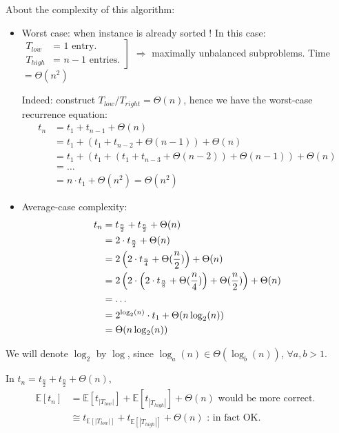 About the complexity of this algorithm:
\begin{itemize}
\renewcommand{\labelitemi}{$\bullet$}
\item Worst case: when instance is already sorted ! \newline
In this case: $\left.
	\begin{array}{ll}
       T_{low} & \text{= 1 entry}.\\
       T_{high} &\text{= $n-1$ entries}.
			\end{array}
  \right]$ $\Rightarrow$ maximally unbalanced subproblems. Time $= \Theta(n^2)$ 
	
	Indeed: construct $T_{low}/ T_{right} = \Theta(n)$, hence we have the worst-case recurrence equation: 
	\begin{align*}
t_n & = t_1 + t_{n-1}+ \Theta(n)\\
 & = t_1 + \left( t_1 + t_{n-2} + \Theta(n-1)\right)+ \Theta(n)\\
& = t_1 + \left( t_1 + (t_1 + t_{n-3}+ \Theta(n-2)) + \Theta(n-1)\right)+ \Theta(n)\\
& = \ldots \\
& = n \cdot t_1 + \Theta(n^2) = \Theta(n^2)
\end{align*}

\item Average-case complexity: 
\begin{align}
t_n & = t_{\frac{n}{2}}+ t_{\frac{n}{2}}+ \Theta(n) \label{eq:quickSort_average} \\
& = 2 \cdot t_{\frac{n}{2}} + \Theta(n)  \notag \\
& = 2 \left( 2 \cdot t_{\frac{n}{4}} + \Theta(\frac{n}{2})\right) + \Theta(n)  \notag \\
& =  2 \left( 2 \cdot \left(2 \cdot t_{\frac{n}{8}} + \Theta(\frac{n}{4})\right) + \Theta(\frac{n}{2})\right) + \Theta(n)  \notag \\
& = \ldots  \notag \\
& = 2^{\log_2(n)} \cdot t_1 + \Theta(n \log_2(n))  \notag \\
& = \Theta(n \log_2(n)) \notag
\end{align}
\end{itemize}

\begin{remark}
We will denote $\log_2$ by $\log$, since $\log_a(n)\in \Theta(\log_b(n))$, $\forall a,b >1$. 
\end{remark}

\begin{remark}
In $t_n = t_{\frac{n}{2}}+ t_{\frac{n}{2}} + \Theta(n)$,
\begin{align*}
\mathbb{E}[t_n] & = \mathbb{E}[t_{|T_{low}|}]+ \mathbb{E}[t_{|T_{high}|}] + \Theta(n) \text{ would be more correct.} & \\
& \cong t_{\mathbb{E}[|T_{low}|]} + t_{\mathbb{E}[|T_{high}|]}  + \Theta(n) \text{ : in fact OK.}
\end{align*}
\end{remark}

